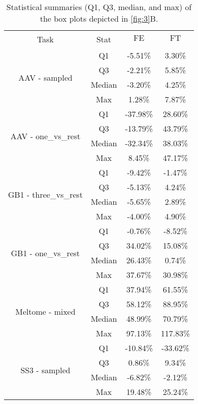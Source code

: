 \begin{table}
	\caption{\centering Statistical summaries (Q1, Q3, median, and max) of the box plots depicted in \autoref{fig:3}B.}
	\label{tab:box}
	\centering
	\renewcommand{\arraystretch}{1.5}
	\begin{tabular}{cccc}
	\toprule
	\multicolumn{1}{c}{\multirow{2}{*}{Task}} & \multicolumn{1}{c}{\multirow{2}{*}{Stat}} & \multicolumn{1}{c}{FE} & FT \\
	\multicolumn{1}{c}{} & \multicolumn{1}{c}{} & \multicolumn{1}{c}{} & \\
	\midrule
	\multirow{4}{*}{AAV - sampled} & Q1 & -5.51\% & 3.30\% \\
	 & Q3 & -2.21\% & 5.85\% \\
	 & Median & -3.20\% & 4.25\% \\
	 & Max & 1.28\% & 7.87\% \\
	\hline
	\multirow{4}{*}{AAV - one\_vs\_rest} & Q1 & -37.98\% & 28.60\% \\
	 & Q3 & -13.79\% & 43.79\% \\
	 & Median & -32.34\% & 38.03\% \\
	 & Max & 8.45\% & 47.17\% \\
	\hline
	\multirow{4}{*}{GB1 - three\_vs\_rest} & Q1 & -9.42\% & -1.47\% \\
	 & Q3 & -5.13\% & 4.24\% \\
	 & Median & -5.65\% & 2.89\% \\
	 & Max & -4.00\% & 4.90\% \\
	\hline
	\multirow{4}{*}{GB1 - one\_vs\_rest} & Q1 & -0.76\% & -8.52\% \\
	 & Q3 & 34.02\% & 15.08\% \\
	 & Median & 26.43\% & 0.74\% \\
	 & Max & 37.67\% & 30.98\% \\
	\hline
	\multirow{4}{*}{Meltome - mixed} & Q1 & 37.94\% & 61.55\% \\
	 & Q3 & 58.12\% & 88.95\% \\
	 & Median & 48.99\% & 70.79\% \\
	 & Max & 97.13\% & 117.83\% \\
	\hline
	\multirow{4}{*}{SS3 - sampled} & Q1 & -10.84\% & -33.62\% \\
	 & Q3 & 0.86\% & 9.34\% \\
	 & Median & -6.82\% & -2.12\% \\
	 & Max & 19.48\% & 25.24\% \\
	\hline
	\end{tabular}
\end{table}
